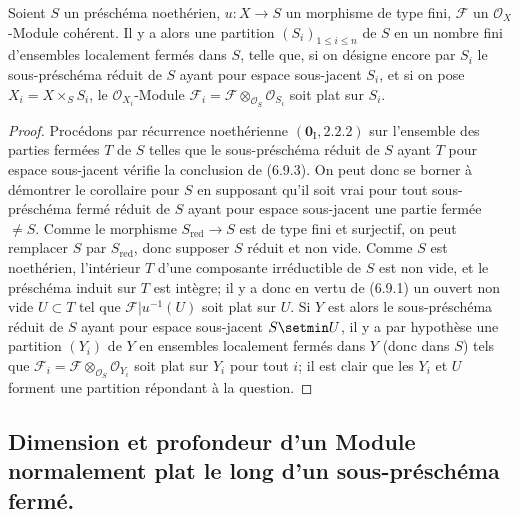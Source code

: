 \begin{corollary}[6.9.3]
\label{IV.2.s6.9.3-fr}
Soient $S$ un préschéma noethérien, $u:X\to S$ un morphisme de type fini,
$\mathcal F$ un $\mathcal O_X$-Module cohérent. Il y a alors une partition
$(S_i)_{1\leq i\leq n}$ de $S$ en un nombre fini d'ensembles localement fermés
dans $S$, telle que, si on désigne encore par $S_i$ le sous-préschéma réduit
de $S$ ayant pour espace sous-jacent $S_i$, et si on pose
$X_i=X\times_S S_i$, le $\mathcal O_{X_i}$-Module
$\mathcal F_i=\mathcal F\otimes_{\mathcal O_S}\mathcal O_{S_i}$ soit plat
sur $S_i$.
\end{corollary}

\begin{proof}
Procédons par récurrence noethérienne $(\mathbf{0}_{\mathrm I},2.2.2)$ sur l'ensemble
des parties fermées $T$ de $S$ telles que le sous-préschéma réduit de $S$
ayant $T$ pour espace sous-jacent vérifie la conclusion de (6.9.3). On peut
donc se borner à démontrer le corollaire pour $S$ en supposant qu'il soit vrai
pour tout sous-préschéma fermé réduit de $S$ ayant pour espace sous-jacent une
partie fermée $\ne S$. Comme le morphisme $S_{\mathrm{red}}\to S$ est de type
fini et surjectif, on peut remplacer $S$ par $S_{\mathrm{red}}$, donc supposer
$S$ réduit et non vide. Comme $S$ est noethérien, l'intérieur $T$ d'une
composante irréductible de $S$ est non vide, et le préschéma induit sur $T$
est intègre; il y a donc en vertu de (6.9.1) un ouvert non vide $U\subset T$
tel que $\mathcal F|u^{-1}(U)$ soit plat sur $U$. Si $Y$ est alors le
sous-préschéma réduit de $S$ ayant pour espace sous-jacent $S\setmin U$, il y a par
hypothèse une partition $(Y_i)$ de $Y$ en ensembles localement fermés dans
$Y$ (donc dans $S$) tels que
$\mathcal F_i=\mathcal F\otimes_{\mathcal O_S}\mathcal O_{Y_i}$ soit plat
sur $Y_i$ pour tout $i$; il est clair que les $Y_i$ et $U$ forment une
partition répondant à la question.
\end{proof}

\subsection{Dimension et profondeur d'un Module normalement plat le long d'un
sous-préschéma fermé.}
\label{subsection:IV.6.10}


